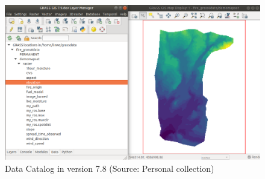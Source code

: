 \documentclass[a4paper,10pt,twoside]{article}
\begin{document}

\vspace{0.3cm}
\begin{figure}[hbt!] 
\begin{center}
\includegraphics[width=16cm]{../pictures/data_catalog_pred.png} 
\caption[Data Catalog in version 7.8]{Data Catalog in version 7.8 (Source: Personal collection)}
\label{fig:data_catalog_pred}
\end{center}
\end{figure}

\newpage
\vspace*{-1cm}
\end{document}
